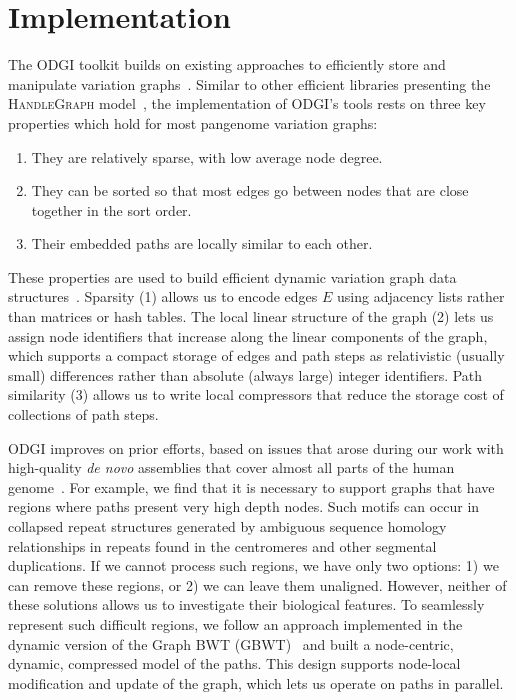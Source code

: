 \documentclass{bioinfo}
\newcommand{\red}[1]{{\textcolor{Red}{#1}}}
\newcommand{\FIXME}[1]{\red{[FIXME: #1]}}
\begin{document}

\section{Implementation}
The ODGI toolkit builds on existing approaches to efficiently store and manipulate variation graphs~\citep{Garrison:2018}.
Similar to other efficient libraries presenting the \textsc{HandleGraph} model~\citep{Eizenga_2020_BX}, the implementation of ODGI's tools rests on three key properties which hold for most pangenome variation graphs:

\begin{enumerate}
\item They are relatively sparse, with low average node degree.
\item They can be sorted so that most edges go between nodes that are close together in the sort order.
\item Their embedded paths are locally similar to each other.
\end{enumerate}

These properties are used to build efficient dynamic variation graph data structures~\citep{Siren:2020,Eizenga_2020_BX}.
Sparsity (1) allows us to encode edges $E$ using adjacency lists rather than matrices or hash tables.
The local linear structure of the graph (2) lets us assign node identifiers that increase along the linear components of the graph, which supports a compact storage of edges and path steps as relativistic (usually small) differences rather than absolute (always large) integer identifiers.
Path similarity (3) allows us to write local compressors that reduce the storage cost of collections of path steps.

ODGI improves on prior efforts, based on issues that arose during our work with high-quality \textit{de novo} assemblies that cover almost all parts of the human genome~\citep{Logsdon_2021,Nurk_2021}.
For example, we find that it is necessary to support graphs that have regions where paths present very high depth nodes.
Such motifs can occur in collapsed repeat structures generated by ambiguous sequence homology relationships in repeats found in the centromeres and other segmental duplications.
If we cannot process such regions, we have only two options: 1) we can remove these regions, or 2) we can leave them unaligned.
However, neither of these solutions allows us to investigate their biological features.
To seamlessly represent such difficult regions, we follow an approach implemented in the dynamic version of the Graph BWT (GBWT)~\citep{Siren:2020} and built a node-centric, dynamic, compressed model of the paths.
This design supports node-local modification and update of the graph, which lets us operate on paths in parallel.
\end{document}

